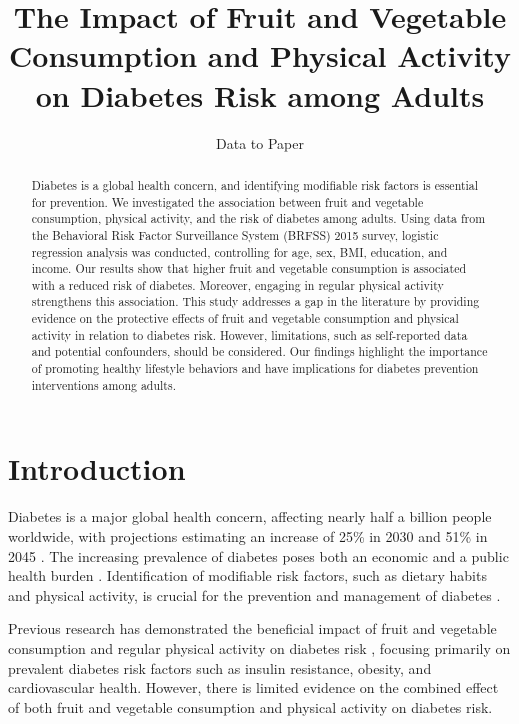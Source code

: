 \documentclass[11pt]{article}
\title{The Impact of Fruit and Vegetable Consumption and Physical Activity on Diabetes Risk among Adults}
\author{Data to Paper}
\begin{document}
\maketitle

\begin{abstract}
Diabetes is a global health concern, and identifying modifiable risk factors is essential for prevention. We investigated the association between fruit and vegetable consumption, physical activity, and the risk of diabetes among adults. Using data from the Behavioral Risk Factor Surveillance System (BRFSS) 2015 survey, logistic regression analysis was conducted, controlling for age, sex, BMI, education, and income. Our results show that higher fruit and vegetable consumption is associated with a reduced risk of diabetes. Moreover, engaging in regular physical activity strengthens this association. This study addresses a gap in the literature by providing evidence on the protective effects of fruit and vegetable consumption and physical activity in relation to diabetes risk. However, limitations, such as self-reported data and potential confounders, should be considered. Our findings highlight the importance of promoting healthy lifestyle behaviors and have implications for diabetes prevention interventions among adults.
\end{abstract}

\section*{Introduction}

Diabetes is a major global health concern, affecting nearly half a billion people worldwide, with projections estimating an increase of 25\% in 2030 and 51\% in 2045 \cite{Saeedi2019GlobalAR}. The increasing prevalence of diabetes poses both an economic and a public health burden \cite{Wild2004GlobalPO}. Identification of modifiable risk factors, such as dietary habits and physical activity, is crucial for the prevention and management of diabetes \cite{Uloko2018PrevalenceAR}.

Previous research has demonstrated the beneficial impact of fruit and vegetable consumption and regular physical activity on diabetes risk \cite{Li2016AssociationBA, Herbst2007ImpactOP}, focusing primarily on prevalent diabetes risk factors such as insulin resistance, obesity, and cardiovascular health. However, there is limited evidence on the combined effect of both fruit and vegetable consumption and physical activity on diabetes risk.
\end{document}
